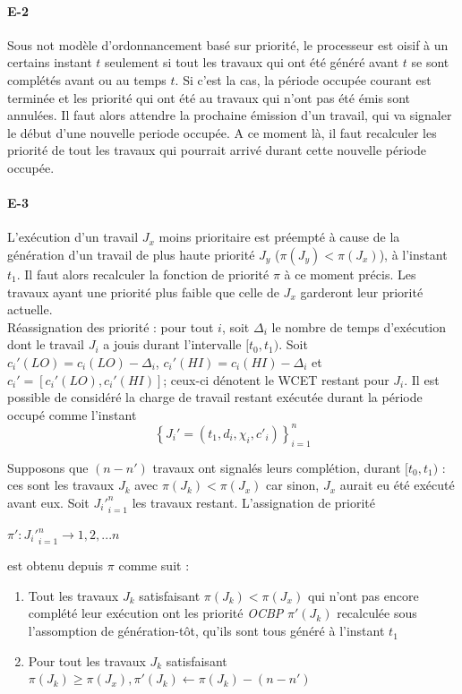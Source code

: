 \documentclass[12pt,a4paper,oneside]{book}
\theoremstyle{break}
\theoremstyle{breakplain}
\begin{document}
\paragraph{E-2}
Sous not modèle d'ordonnancement basé sur priorité, le processeur est oisif à un certains instant $t$ seulement si tout les travaux qui ont été généré avant $t$ se sont complétés avant ou au temps $t$. Si c'est la cas, la période occupée courant est terminée et les priorité qui ont été au travaux qui n'ont pas été émis sont annulées. Il faut alors attendre la prochaine émission d'un travail, qui va signaler le début d'une nouvelle periode occupée. A ce moment là, il faut recalculer les priorité de tout les travaux qui pourrait arrivé durant cette nouvelle période occupée.

\paragraph{E-3}
L'exécution d'un travail $J_x$ moins prioritaire est préempté à cause de la génération d'un travail de plus haute priorité $J_y$ ($\pi(J_y) < \pi(J_x)$), à l'instant $t_1$. Il faut alors recalculer la fonction de priorité $\pi$ à ce moment précis. Les travaux ayant une priorité plus faible que celle de $J_x$ garderont leur priorité actuelle.\\

Réassignation des priorité : pour tout $i$, soit $\Delta_i$ le nombre de temps d'exécution dont le travail $J_i$ a jouis durant l'intervalle $[t_0, t_1)$. Soit $c_i'(LO) = c_i(LO)-\Delta_i$, $c_i'(HI) = c_i(HI)-\Delta_i$ et $c_i' = [c_i'(LO), c_i'(HI)]$; ceux-ci dénotent le WCET restant pour $J_i$. Il est possible de considéré la charge de travail restant exécutée durant la période occupé comme l'instant 
\begin{equation}
\left\lbrace J_i' = (t_1, d_i, \chi_i, c'_i) \right\rbrace^n_{i=1}
\end{equation}

Supposons que $(n-n')$ travaux ont signalés leurs complétion, durant $[t_0, t_1)$ : ces sont les travaux $J_k$ avec $\pi(J_k) < \pi(J_x)$ car sinon, $J_x$ aurait eu été exécuté avant eux. Soit ${J_i'}^n_{i=1}$ les travaux restant. L'assignation de priorité
\begin{center}
$\pi' : {J_i'}^n_{i=1} \rightarrow {1,2,...n}$
\end{center}
est obtenu depuis $\pi$ comme suit :
\begin{enumerate}
\item Tout les travaux $J_k$ satisfaisant $\pi(J_k) < \pi(J_x)$ qui n'ont pas encore complété leur exécution ont les priorité \textit{OCBP} $\pi'(J_k)$ recalculée sous l'assomption de génération-tôt, qu'ils sont tous généré à l'instant $t_1$
\item Pour tout les travaux $J_k$ satisfaisant $\pi(J_k) \geq \pi(J_x), \pi'(J_k) \leftarrow \pi(J_k) -(n-n')$
\end{enumerate}
\end{document}
